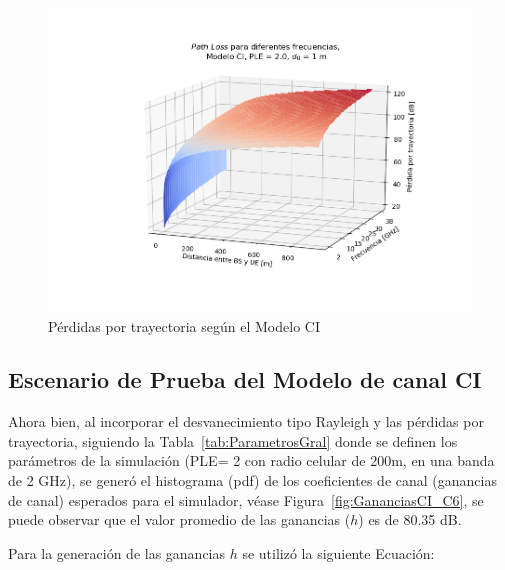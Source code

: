 \begin{figure}[th]
    \centering
    \includegraphics[scale=.6]{Figures/MODELOCI3D_1m.png}
    \decoRule
    \caption[Pérdidas por trayectoria según el Modelo CI]{Pérdidas por trayectoria según el Modelo CI}
    \label{fig:PerdidasCI_C6}
\end{figure}

\subsection{Escenario de Prueba del Modelo de canal CI}

Ahora bien, al incorporar el desvanecimiento tipo Rayleigh y las pérdidas por trayectoria, siguiendo la Tabla~\ref{tab:ParametrosGral} donde se definen los parámetros de la simulación (PLE= 2 con radio celular de 200m, en una banda de 2 GHz), se generó el histograma (pdf) de los coeficientes de canal (ganancias de canal) esperados para el simulador, véase Figura~\ref{fig:GananciasCI_C6}, se puede observar que el valor promedio de las ganancias ($h$) es de 80.35 dB. \newline

Para la generación de las ganancias $h$ se utilizó la siguiente Ecuación:\newline


